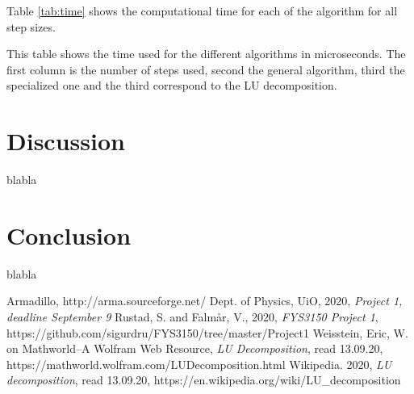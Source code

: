 \documentclass[reprint, english,notitlepage]{revtex4-1}  %
\begin{document}
Table \ref{tab:time} shows the computational time for each of the algorithm for all step sizes.

\begin{table}  %
  
  \caption{This table shows the time used for the different algorithms in microseconds. The first column is the number of steps used, second the general algorithm, third the specialized one and the third correspond to the LU decomposition.}
	\label{tab:time}
\end{table}



\section{Discussion}

blabla



\section{Conclusion}

blabla



\onecolumngrid
\vspace{1cm} %
\newpage

\begin{thebibliography}{}
   Armadillo, http://arma.sourceforge.net/
   Dept. of Physics, UiO,  2020, \textit{Project 1, deadline September 9}
   Rustad, S. and Falmår, V.,  2020, \textit{FYS3150 Project 1}, https://github.com/sigurdru/FYS3150/tree/master/Project1
   Weisstein, Eric, W. on Mathworld--A Wolfram Web Resource, \textit{LU Decomposition}, read 13.09.20, https://mathworld.wolfram.com/LUDecomposition.html
   Wikipedia.  2020, \textit{LU decomposition}, read 13.09.20, https://en.wikipedia.org/wiki/LU\_decomposition
\end{thebibliography}
\end{document}
